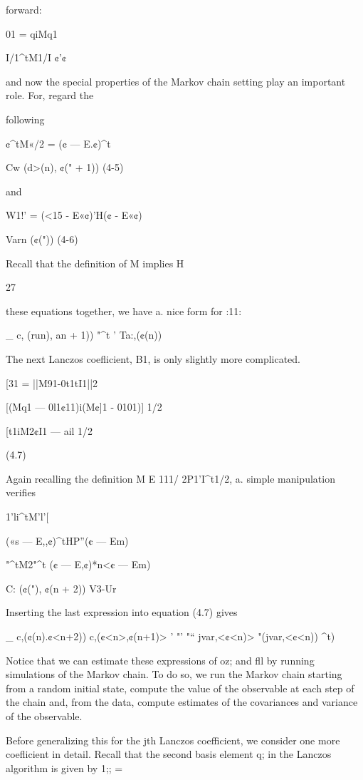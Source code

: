 forward:

01 = qiMq1

I/1^tM1/I
¢’¢

and now the special properties of the Markov chain setting play an important role. For, regard the

following

¢^tM«/2 = (¢ — E.¢)^t\Psi%

Cw (d>(n), ¢(" + 1)) (4-5)

and

W1!’ = (<15 - E«¢)'H(¢ - E«¢)

Varn (¢(")) (4-6)

Recall that the definition of M implies H%

27

these equations together, we have a. nice form for :11:

_ c, (run), an + 1))
"^t ' Ta:,(¢(n))

The next Lanczos coeﬂicient, B1, is only slightly more complicated.

[31 = ||M91-0t1tI1||2

[(Mq1 — 0l1¢11)i(M¢]1 - 0101)] 1/2

[t1iM2¢I1 — ail 1/2

(4.7)

Again recalling the definition M E 111/ 2P1'I^t1/2, a. simple manipulation verifies

1'li^tM’l'[%

(«s — E,,¢)^tHP”(¢ — Em)

"^tM2"^t (¢ — E,¢)*n<¢ — Em)

C: (¢("), ¢(n + 2))
V3-Ur 

Inserting the last expression into equation (4.7) gives

_ c,(¢(n).¢<n+2)) c,(¢<n>,¢(n+1)> ’ "’
"“ jvar,<¢<n)> "(jvar,<¢<n)) ^t)

Notice that we can estimate these expressions of oz; and ﬂl by running simulations of the Markov
chain. To do so, we run the Markov chain starting from a random initial state, compute the value of
the observable at each step of the chain and, from the data, compute estimates of the covariances
and variance of the observable.

Before generalizing this for the jth Lanczos coefficient, we consider one more coeﬂicient
in detail. Recall that the second basis element q; in the Lanczos algorithm is given by 1;; =

